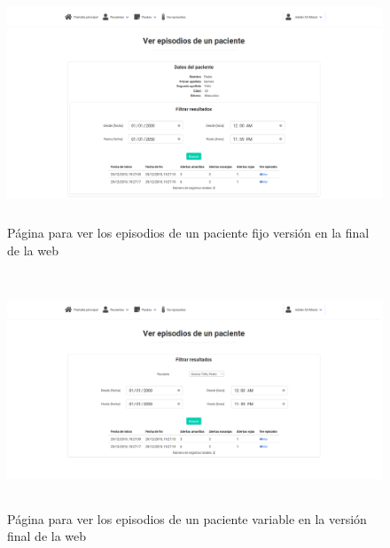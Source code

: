 \begin{figure}[H]
    \centering
    \includegraphics[height=7cm, width=\textwidth]{Imagenes/5-verEpisodios.png}
    \caption[Página para ver los episodios de un paciente fijo en la versión final de la web]{Página para ver los episodios de un paciente fijo versión en la final de la web}
    \label{fig:c4:impl9}
\end{figure}

\begin{figure}[H]
    \centering
    \includegraphics[height=7cm, width=\textwidth]{Imagenes/6-verEpisodiosGenerico.png}
    \caption[Página para ver los episodios de un paciente variable versión en la final de la web]{Página para ver los episodios de un paciente variable en la versión final de la web}
    \label{fig:c4:impl10}
\end{figure}

